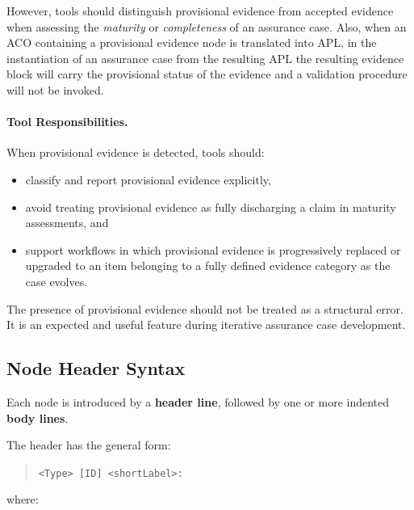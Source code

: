 \documentclass[11pt]{article}
\begin{document}
However, tools should distinguish provisional evidence from accepted evidence when
assessing the \emph{maturity} or \emph{completeness} of an assurance case.
Also, when an ACO containing a provisional evidence node is translated into APL, in the instantiation of an assurance case from the resulting APL the resulting evidence block will carry the provisional status of the evidence and a validation procedure will not be invoked.

\paragraph{Tool Responsibilities.}
When provisional evidence is detected, tools should:
\begin{itemize}[leftmargin=2em]
  \item classify and report provisional evidence explicitly,
  \item avoid treating provisional evidence as fully discharging a claim in
        maturity assessments, and
  \item support workflows in which provisional evidence is progressively replaced
        or upgraded to an item belonging to a fully defined evidence category as the case evolves.
\end{itemize}

The presence of provisional evidence should not be treated as a structural error.
It is an expected and useful feature during iterative assurance case development.

\subsection{Node Header Syntax}

Each node is introduced by a \textbf{header line}, followed by one or more indented \textbf{body lines}.

The header has the general form:
\begin{quote}
\texttt{\textless Type\textgreater{} [ID] \textless shortLabel\textgreater:}
\end{quote}

where:
\end{document}
